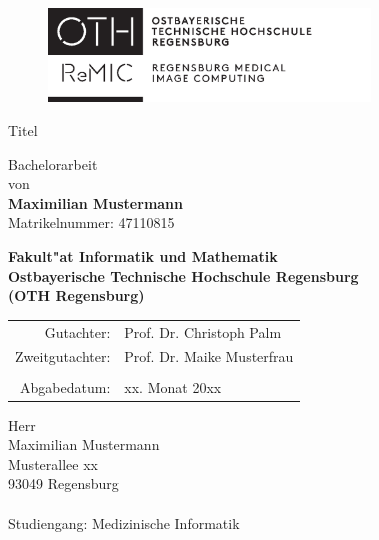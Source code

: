 \documentclass[12pt,a4paper,headinclude,twoside, plainheadsepline, open=right,numbers=noenddot]{scrreprt}
\begin{document}
\pagestyle{empty}

\clearscrheadings\clearscrplain

\begin{titlepage}
\begin{figure}[thb]
       \includegraphics[height=2.5cm]{./Images/OTH_Logo_ReMIC.eps}
\end{figure}
\begin{center}
\rule{0pt}{0pt}
\vfill
\vfill
\vfill
\vfill

\begin{huge}
Titel\\[0.75ex]
\end{huge}

\vfill
\vfill

Bachelorarbeit\\ von\\

\vspace*{.5cm}
\textbf{Maximilian Mustermann}\\
Matrikelnummer: 47110815
\vspace{.5cm}

\vfill
\vfill
\textbf{\large Fakult"at Informatik und Mathematik\\
Ostbayerische Technische Hochschule Regensburg\\
(OTH Regensburg)}
\vfill
\vfill

\begin{tabular}{rl}
Gutachter:   & Prof. Dr. Christoph Palm\\
Zweitgutachter:   & Prof. Dr. Maike Musterfrau\\
\\Abgabedatum:& xx. Monat 20xx
\end{tabular}
\end{center}
\end{titlepage}



\text{ }
\vspace{11cm}

Herr\\
Maximilian Mustermann\\
Musterallee xx\\
93049 Regensburg\\\\
Studiengang: Medizinische Informatik\\
\end{document}
